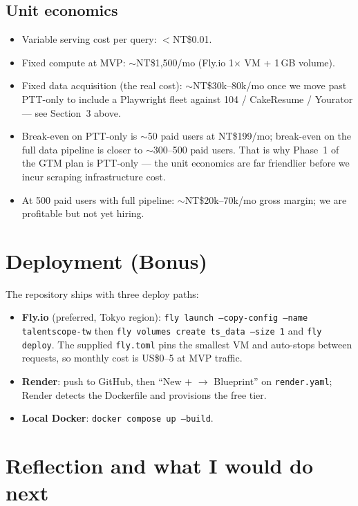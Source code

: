\documentclass[11pt,a4paper]{article}
\begin{document}
\subsection*{Unit economics}
\begin{itemize}[leftmargin=*,itemsep=0.1em,topsep=0.2em]
  \item Variable serving cost per query: $<$NT\$0.01.
  \item Fixed compute at MVP: $\sim$NT\$1,500/mo (Fly.io 1$\times$ VM
    + 1\,GB volume).
  \item Fixed data acquisition (the real cost): $\sim$NT\$30k--80k/mo
    once we move past PTT-only to include a Playwright fleet against
    104 / CakeResume / Yourator --- see Section~3 above.
  \item Break-even on PTT-only is $\sim$50 paid users at NT\$199/mo;
    break-even on the full data pipeline is closer to $\sim$300--500
    paid users. That is why Phase~1 of the GTM plan is PTT-only ---
    the unit economics are far friendlier before we incur scraping
    infrastructure cost.
  \item At 500 paid users with full pipeline: $\sim$NT\$20k--70k/mo
    gross margin; we are profitable but not yet hiring.
\end{itemize}

\section{Deployment (Bonus)}

The repository ships with three deploy paths:

\begin{itemize}[leftmargin=*,itemsep=0.1em,topsep=0.2em]
  \item \textbf{Fly.io} (preferred, Tokyo region): \texttt{fly launch
    --copy-config --name talentscope-tw} then \texttt{fly volumes create
    ts\_data --size 1} and \texttt{fly deploy}. The supplied
    \texttt{fly.toml} pins the smallest VM and auto-stops between
    requests, so monthly cost is US\$0--5 at MVP traffic.
  \item \textbf{Render}: push to GitHub, then ``New $+$ $\to$ Blueprint''
    on \texttt{render.yaml}; Render detects the Dockerfile and provisions
    the free tier.
  \item \textbf{Local Docker}: \texttt{docker compose up --build}.
\end{itemize}

\section{Reflection and what I would do next}
\end{document}
